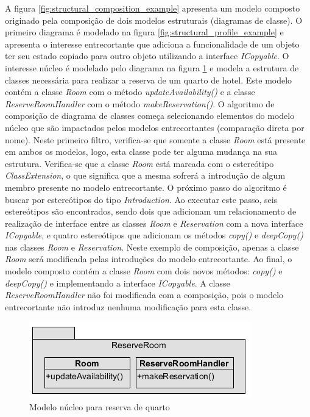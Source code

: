 A figura \ref{fig:structural_composition_example} apresenta um modelo composto originado pela composição de dois modelos estruturais (diagramas de
classe). O primeiro diagrama é modelado na figura \ref{fig:structural_profile_example} e apresenta o interesse entrecortante que adiciona a
funcionalidade de um objeto ter seu estado copiado para outro objeto utilizando a interface \textit{ICopyable}. O interesse núcleo é modelado pelo diagrama na figura
\ref{fig:structural_core_concern_class_diagram} e modela a estrutura de classes necessária para realizar a reserva de um quarto de hotel. Este
modelo contém a classe \textit{Room} com o método \textit{updateAvailability()} e a classe \textit{ReserveRoomHandler} com o
método \textit{makeReservation()}. O algoritmo de composição de diagrama de classes começa selecionando elementos do modelo núcleo que são
impactados pelos modelos entrecortantes (comparação direta por nome). Neste primeiro filtro, verifica-se que somente a classe \textit{Room} está
presente em ambos os modelos, logo, esta classe pode ter alguma mudança na sua estrutura. Verifica-se que a classe \textit{Room} está marcada com o 
estereótipo \textit{ClassExtension}, o que significa que a mesma sofrerá a introdução de algum membro presente no modelo entrecortante. O próximo
passo do algoritmo é buscar por estereótipos do tipo \textit{Introduction}. Ao executar este passo, seis estereótipos são encontrados, sendo dois
que adicionam um relacionamento de realização de interface entre as classes \textit{Room} e \textit{Reservation} com a nova interface
\textit{ICopyable}, e quatro estereótipos que adicionam os métodos \textit{copy()} e \textit{deepCopy()} nas classes \textit{Room} e
\textit{Reservation}. Neste exemplo de composição, apenas a classe \textit{Room} será modificada pelas introduções do modelo entrecortante. Ao final, 
o modelo composto contém a classe \textit{Room} com dois novos métodos: \textit{copy()} e \textit{deepCopy()} e implementando a interface \textit{ICopyable}. 
A classe \textit{ReserveRoomHandler} não foi modificada com a composição, pois o modelo entrecortante não introduz nenhuma modificação para esta
classe.

  \begin{figure}[!h]
	\centering
	\includegraphics{img/structural_core_concern_class_diagram.png}
	\caption{Modelo núcleo para reserva de quarto}\label{fig:structural_core_concern_class_diagram}
  \end{figure}
    
